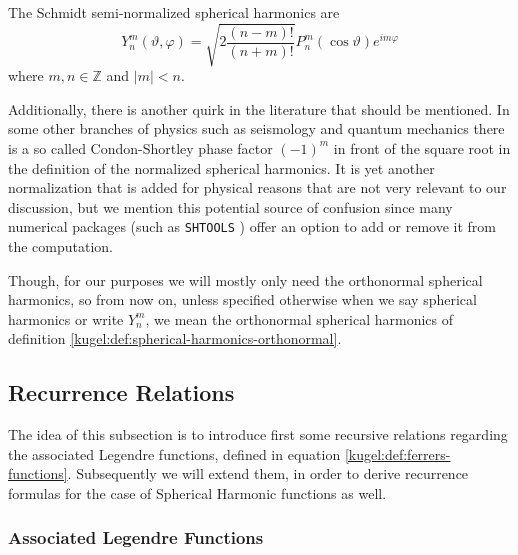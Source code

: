 \begin{definition}
  \label{kugel:def:spherical-harmonics-schmidt}
  The Schmidt semi-normalized spherical harmonics are
  \begin{equation*}
    Y^m_n(\vartheta, \varphi)
    = \sqrt{2 \frac{(n - m)!}{(n + m)!}}
      P^m_n(\cos \vartheta) e^{im\varphi}
  \end{equation*}
  where $m, n \in \mathbb{Z}$ and $|m| < n$.
\end{definition}

Additionally, there is another quirk in the literature that should be mentioned.
In some other branches of physics such as seismology and quantum mechanics there
is a so called Condon-Shortley phase factor $(-1)^m$ in front of the square root
in the definition of the normalized spherical harmonics. It is yet another
normalization that is added for physical reasons that are not very relevant to
our discussion, but we mention this potential source of confusion since many
numerical packages (such as \texttt{SHTOOLS}
\cite{markwieczorek_shtoolsshtools_2022}) offer an option to add or remove it
from the computation.

Though, for our purposes we will mostly only need the orthonormal spherical
harmonics, so from now on, unless specified otherwise when we say spherical
harmonics or write $Y^m_n$, we mean the orthonormal spherical harmonics of
definition \ref{kugel:def:spherical-harmonics-orthonormal}.

\subsection{Recurrence Relations}
\label{kugel:sec:construction:recurrence}

The idea of this subsection is to introduce first some recursive relations
regarding the associated Legendre functions, defined in equation
\eqref{kugel:def:ferrers-functions}. Subsequently we will extend them, in order
to derive recurrence formulas for the case of Spherical Harmonic functions as
well.

\subsubsection{Associated Legendre Functions}

